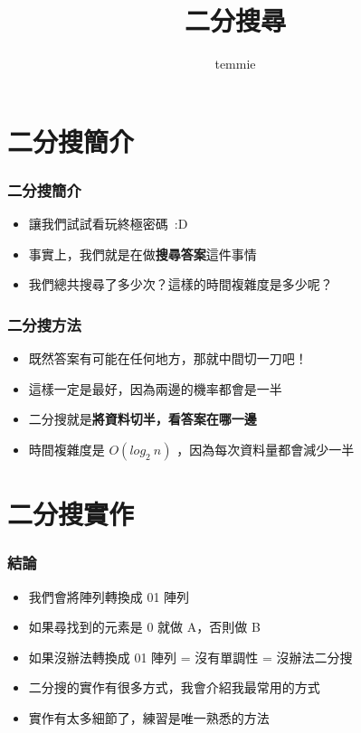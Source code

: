 \documentclass[mathserif]{beamer}
\title{二分搜尋}
\author{temmie}
\date{}
\begin{document}
\begin{frame}
    \titlepage
\end{frame}

\begin{frame}
    \tableofcontents
\end{frame}

\section{二分搜簡介}

\begin{frame}
    \frametitle{二分搜簡介}
    \begin{itemize}
        \item 讓我們試試看玩終極密碼\ :D
        \item<2-> 事實上，我們就是在做\textbf{搜尋答案}這件事情
        \item<2-> 我們總共搜尋了多少次？這樣的時間複雜度是多少呢？
    \end{itemize}
\end{frame}

\begin{frame}
    \frametitle{二分搜方法}
    \begin{itemize}
        \item 既然答案有可能在任何地方，那就中間切一刀吧！
        \item 這樣一定是最好，因為兩邊的機率都會是一半
        \item<2-> 二分搜就是\textbf{將資料切半，看答案在哪一邊}
        \item<2-> 時間複雜度是 $O(log_2\ n)$ ，因為每次資料量都會減少一半
    \end{itemize}

\end{frame}

\section{二分搜實作}

\begin{frame}
    \frametitle{結論}
    \begin{itemize}
        \item 我們會將陣列轉換成 01 陣列
        \item 如果尋找到的元素是 0 就做 A，否則做 B
        \item 如果沒辦法轉換成 01 陣列 = 沒有單調性 = 沒辦法二分搜
        \vspace{0.5cm}
        \item<2-> 二分搜的實作有很多方式，我會介紹我最常用的方式
        \item<2-> 實作有太多細節了，練習是唯一熟悉的方法
    \end{itemize}
\end{frame}
\end{document}
